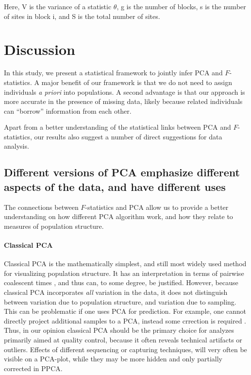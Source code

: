 \documentclass[12pt, letterpaper]{article}
\begin{document}
Here, V is the variance of a statistic $\theta$, g is the number of blocks, s is the number of sites in block i, and S is the total number of sites.


\section{Discussion}
In this study, we present a statistical framework to jointly infer PCA and $F$-statistics. A major benefit of our framework is that we do not need to assign individuals \textit{a priori} into populations. A second advantage is that our approach is more accurate in the presence of missing data, likely because related individuals can ``borrow'' information from each other.

Apart from a better understanding of the statistical links between PCA and $F$-statistics, our results also suggest a number of direct suggestions for data analysis.

\subsection{Different versions of PCA emphasize different aspects of the data, and have different uses}
The connections between $F$-statistics and PCA allow us to provide a better understanding on how different PCA algorithm work, and how they relate to measures of population structure.
\paragraph{Classical PCA}
Classical PCA is the mathematically simplest, and still most widely used method for visualizing population structure. It has an interpretation in terms of pairwise coalescent times \citep{mcvean_genealogical_2009}, and thus can, to some degree, be justified. However, because classical PCA incorporates \emph{all} variation in the data, it does not distinguish between variation due to population structure, and variation due to sampling. This can be problematic if one uses PCA for prediction. For example, one cannot directly project additional samples to a PCA, instead some crrection is required \citep{patterson_population_2006}.  Thus,  in our opinion classical PCA should be the primary choice for analyzes primarily aimed at quality control, because it often reveals technical artifacts or outliers. Effects of different sequencing or capturing techniques, will very often be visible on a PCA-plot, while they may be more hidden and only partially corrected in PPCA.
\end{document}
